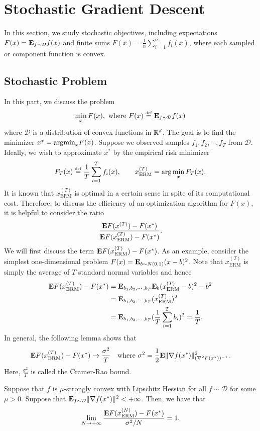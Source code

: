 
\section{Stochastic Gradient Descent\label{sec:Stochastic-Gradient-Descent}}

In this section, we study stochastic objectives, including expectations
$F(x)=\mathbf{E}_{f\sim\mathcal{D}}f(x)$ and finite sums $F(x)=\frac{1}{n}\sum^{n}_{i=1}f_{i}(x)$,
where each sampled or component function is convex.

\subsection{Stochastic Problem}

In this part, we discuss the problem
\[
\min_{x}F(x),\mbox{ where }F(x)\stackrel{\mathrm{{\scriptscriptstyle def}}}{=}\mathbf{E}_{f\sim\mathcal{D}}f(x)
\]
where $\mathcal{D}$ is a distribution of convex functions in $\mathbb{R}^{d}$.
The goal is to find the minimizer $x^{*}=\mathrm{argmin}_{x}F(x)$. Suppose
we observed samples $f_{1},f_{2},\cdots,f_{T}$ from $\mathcal{D}$.
Ideally, we wish to approximate $x^{*}$ by the empirical risk minimizer
\[
F_{T}(x)\stackrel{\mathrm{{\scriptscriptstyle def}}}{=}\frac{1}{T}\sum^{T}_{i=1}f_{i}(x),\qquad x^{(T)}_{\mathrm{ERM}}=\arg\min_{x}F_{T}(x).
\]
It is known that $x^{(T)}_{\mathrm{ERM}}$ is optimal in a certain
sense in spite of its computational cost. Therefore, to discuss the
efficiency of an optimization algorithm for $F(x)$, it is helpful
to consider the ratio
\[
\frac{\mathbf{E} F(x^{(T)})-F(x^{*})}{\mathbf{E} F(x^{(T)}_{\mathrm{ERM}})-F(x^{*})}.
\]
We will first discuss the term $\mathbf{E} F(x^{(T)}_{\mathrm{ERM}})-F(x^{*})$.
As an example, consider the simplest one-dimensional problem $F(x)=\mathbf{E}_{b\sim N(0,1)}(x-b)^{2}$.
Note that $x^{(T)}_{\mathrm{ERM}}$ is simply the average of $T$
standard normal variables and hence 
\begin{align*}
\mathbf{E} F(x^{(T)}_{\mathrm{ERM}})-F(x^{*}) & =\mathbf{E}_{b_{1},b_{2},\cdots,b_{T}}\mathbf{E}_{b}(x^{(T)}_{\mathrm{ERM}}-b)^{2}-b^{2}\\
 & =\mathbf{E}_{b_{1},b_{2},\cdots,b_{T}}(x^{(T)}_{\mathrm{ERM}})^{2}\\
 & =\mathbf{E}_{b_{1},b_{2},\cdots,b_{T}}(\frac{1}{T}\sum^{T}_{i=1}b_{i})^{2}=\frac{1}{T}.
\end{align*}
In general, the following lemma shows that
\[
\mathbf{E} F(x^{(T)}_{\mathrm{ERM}})-F(x^{*})\rightarrow\frac{\sigma^{2}}{T}\quad\text{where }\sigma^{2}=\frac{1}{2}\mathbf{E}\|\nabla f(x^{*})\|^{2}_{(\nabla^{2}F(x^{*}))^{-1}}.
\]
Here, $\frac{\sigma^{2}}{T}$ is called the Cramer-Rao bound. 

\begin{lem}
Suppose that $f$ is $\mu$-strongly convex with Lipschitz Hessian
for all $f\sim\mathcal{D}$ for some $\mu>0$. Suppose that $\mathbf{E}_{f\sim\mathcal{D}}\|\nabla f(x^{*})\|^{2}<+\infty$.
Then, we have that
\[
\lim_{N\rightarrow+\infty}\frac{\mathbf{E} F(x^{(N)}_{\mathrm{ERM}})-F(x^{*})}{\sigma^{2}/N}=1.
\]
\end{lem}

